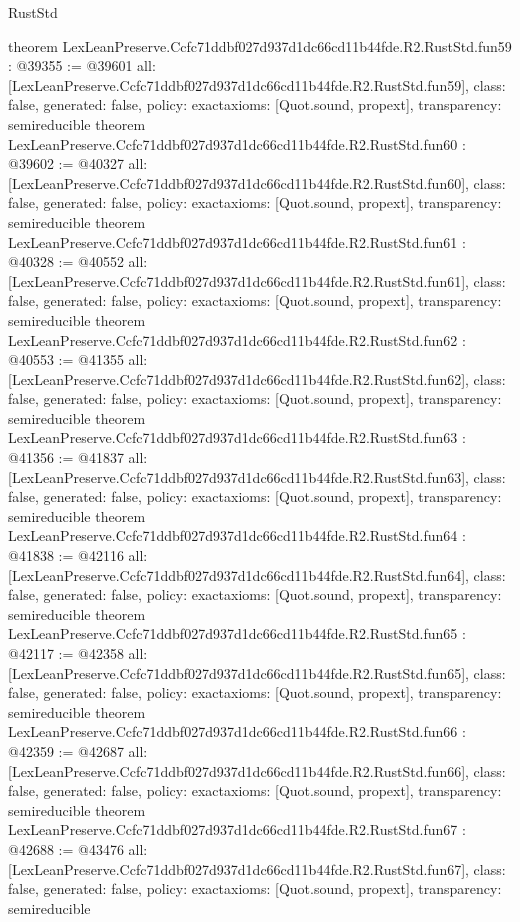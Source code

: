 \begin{lexlean}{RustStd}
\begin{coremodule}
{}
theorem LexLeanPreserve.Ccfc71ddbf027d937d1dc66cd11b44fde.R2.RustStd.fun59 : @39355 := @39601 {
  all: [LexLeanPreserve.Ccfc71ddbf027d937d1dc66cd11b44fde.R2.RustStd.fun59],
  class: false,
  generated: false,
  policy: exact{axioms: [Quot.sound, propext]},
  transparency: semireducible
}
theorem LexLeanPreserve.Ccfc71ddbf027d937d1dc66cd11b44fde.R2.RustStd.fun60 : @39602 := @40327 {
  all: [LexLeanPreserve.Ccfc71ddbf027d937d1dc66cd11b44fde.R2.RustStd.fun60],
  class: false,
  generated: false,
  policy: exact{axioms: [Quot.sound, propext]},
  transparency: semireducible
}
theorem LexLeanPreserve.Ccfc71ddbf027d937d1dc66cd11b44fde.R2.RustStd.fun61 : @40328 := @40552 {
  all: [LexLeanPreserve.Ccfc71ddbf027d937d1dc66cd11b44fde.R2.RustStd.fun61],
  class: false,
  generated: false,
  policy: exact{axioms: [Quot.sound, propext]},
  transparency: semireducible
}
theorem LexLeanPreserve.Ccfc71ddbf027d937d1dc66cd11b44fde.R2.RustStd.fun62 : @40553 := @41355 {
  all: [LexLeanPreserve.Ccfc71ddbf027d937d1dc66cd11b44fde.R2.RustStd.fun62],
  class: false,
  generated: false,
  policy: exact{axioms: [Quot.sound, propext]},
  transparency: semireducible
}
theorem LexLeanPreserve.Ccfc71ddbf027d937d1dc66cd11b44fde.R2.RustStd.fun63 : @41356 := @41837 {
  all: [LexLeanPreserve.Ccfc71ddbf027d937d1dc66cd11b44fde.R2.RustStd.fun63],
  class: false,
  generated: false,
  policy: exact{axioms: [Quot.sound, propext]},
  transparency: semireducible
}
theorem LexLeanPreserve.Ccfc71ddbf027d937d1dc66cd11b44fde.R2.RustStd.fun64 : @41838 := @42116 {
  all: [LexLeanPreserve.Ccfc71ddbf027d937d1dc66cd11b44fde.R2.RustStd.fun64],
  class: false,
  generated: false,
  policy: exact{axioms: [Quot.sound, propext]},
  transparency: semireducible
}
theorem LexLeanPreserve.Ccfc71ddbf027d937d1dc66cd11b44fde.R2.RustStd.fun65 : @42117 := @42358 {
  all: [LexLeanPreserve.Ccfc71ddbf027d937d1dc66cd11b44fde.R2.RustStd.fun65],
  class: false,
  generated: false,
  policy: exact{axioms: [Quot.sound, propext]},
  transparency: semireducible
}
theorem LexLeanPreserve.Ccfc71ddbf027d937d1dc66cd11b44fde.R2.RustStd.fun66 : @42359 := @42687 {
  all: [LexLeanPreserve.Ccfc71ddbf027d937d1dc66cd11b44fde.R2.RustStd.fun66],
  class: false,
  generated: false,
  policy: exact{axioms: [Quot.sound, propext]},
  transparency: semireducible
}
theorem LexLeanPreserve.Ccfc71ddbf027d937d1dc66cd11b44fde.R2.RustStd.fun67 : @42688 := @43476 {
  all: [LexLeanPreserve.Ccfc71ddbf027d937d1dc66cd11b44fde.R2.RustStd.fun67],
  class: false,
  generated: false,
  policy: exact{axioms: [Quot.sound, propext]},
  transparency: semireducible
}
\end{coremodule}
\end{lexlean}
